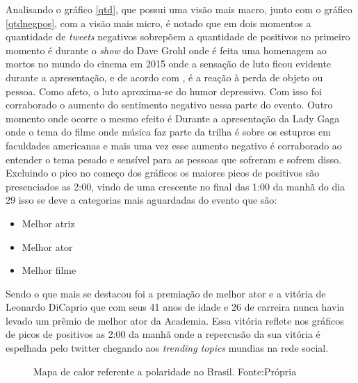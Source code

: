 Analisando o gráfico \ref{qtd}, que possui uma visão mais macro, junto com o gráfico \ref{qtdnegpos}, com a visão mais micro, é notado que em dois momentos a quantidade de \textit{tweets} negativos sobrepõem a quantidade de positivos no primeiro momento é durante o \textit{show} do Dave Grohl onde é feita uma homenagem ao mortos no mundo do cinema em 2015 onde a sensação de luto ficou evidente durante a apresentação, e de acordo com \cite{freud1908conferencias}, é a reação à perda de objeto ou pessoa. Como afeto, o luto aproxima-se do humor depressivo. Com isso foi corraborado o aumento do sentimento negativo nessa parte do evento. Outro momento onde ocorre o mesmo efeito é Durante a apresentação da Lady Gaga onde o tema do filme onde música faz parte da trilha é sobre os estupros em faculdades americanas e mais uma vez esse aumento negativo é corraborado ao entender o tema pesado e sensível para as pessoas que sofreram e sofrem disso. Excluindo o pico no começo dos gráficos os maiores picos de positivos são presenciados as 2:00, vindo de uma crescente no final das 1:00 da manhã do dia 29 isso se deve a categorias mais aguardadas do evento que são:

 \begin{itemize}
 	\item Melhor atriz
 	\item Melhor ator
 	\item Melhor filme
 \end{itemize}

Sendo o que mais se destacou foi a premiação de melhor ator e a vitória de Leonardo DiCaprio que com seus 41 anos de idade e 26 de carreira nunca havia levado um prêmio de melhor ator da Academia. Essa vitória reflete nos gráficos de picos de positivos as 2:00 da manhã onde a repercusão da sua vitória é espelhada pelo twitter chegando aos \textit{trending topics} mundias na rede social.


\begin{figure}[!h]
	\centering{}
	\caption{Mapa de calor referente a polaridade no Brasil. Fonte:Própria}
	\label{mapa}
\end{figure}